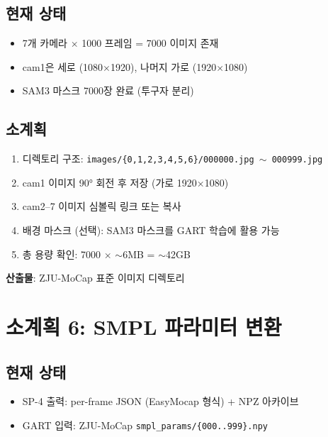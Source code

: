 \documentclass[11pt, a4paper]{report}
\begin{document}
\subsection{현재 상태}
\begin{itemize}
\item 7개 카메라 $\times$ 1000 프레임 = 7000 이미지 존재
\item cam1은 세로 (1080$\times$1920), 나머지 가로 (1920$\times$1080)
\item SAM3 마스크 7000장 완료 (투구자 분리)
\end{itemize}

\subsection{소계획}
\begin{pipelinebox}[title={SP-5: ZJU-MoCap 형식 이미지 구조화}]
\begin{enumerate}
\item 디렉토리 구조: \texttt{images/\{0,1,2,3,4,5,6\}/000000.jpg $\sim$ 000999.jpg}
\item cam1 이미지 90° 회전 후 저장 (가로 1920$\times$1080)
\item cam2--7 이미지 심볼릭 링크 또는 복사
\item 배경 마스크 (선택): SAM3 마스크를 GART 학습에 활용 가능
\item 총 용량 확인: 7000 $\times$ $\sim$6MB = $\sim$42GB
\end{enumerate}
\textbf{산출물}: ZJU-MoCap 표준 이미지 디렉토리
\end{pipelinebox}


\section{소계획 6: SMPL 파라미터 변환}
\label{sec:sp6}

\subsection{현재 상태}
\begin{itemize}
\item SP-4 출력: per-frame JSON (EasyMocap 형식) + NPZ 아카이브
\item GART 입력: ZJU-MoCap \texttt{smpl\_params/\{000..999\}.npy}
\end{itemize}
\end{document}
